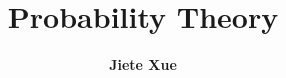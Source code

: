 \documentclass{mathematics}
\title{Probability Theory}
\author{\textbf{Jiete Xue}}
\affil{\texttt{xuejiete@westlake.edu.cn}}
\date{}
\begin{document}
\makefrontmatter

\clearpage

\clearpage

\clearpage

\clearpage

\end{document}
